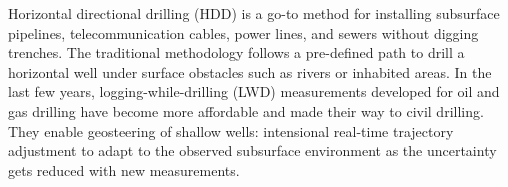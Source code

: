 Horizontal directional drilling (HDD) is a go-to method for installing subsurface pipelines, telecommunication cables, power lines, and sewers without digging trenches. 
The traditional methodology follows a pre-defined path to drill a horizontal well under surface obstacles such as rivers or inhabited areas. 
In the last few years, logging-while-drilling (LWD) measurements developed for oil and gas drilling have become more affordable and made their way to civil drilling. 
They enable geosteering of shallow wells: intensional real-time trajectory adjustment to adapt to the observed subsurface environment as the uncertainty gets reduced with new measurements.
